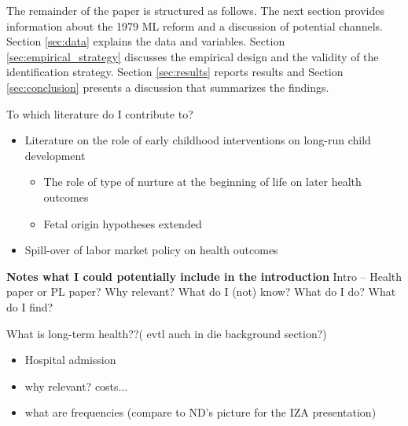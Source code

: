 \documentclass[11pt, a4paper,draft]{article} %
\begin{document}
The remainder of the paper is structured as follows. The next section provides information about the 1979 ML reform and a discussion of potential channels. Section \ref{sec:data} explains the data and variables. Section \ref{sec:empirical_strategy} discusses the empirical design and the validity of the identification strategy. Section \ref{sec:results} reports results and Section \ref{sec:conclusion} presents a discussion that summarizes the findings. 



\newpage
To which literature do I contribute to?
\begin{itemize}
	\item Literature on the role of early childhood interventions on long-run child development
	\begin{itemize}
		\item The role of type of nurture at the beginning of life on later health outcomes
		\item Fetal origin hypotheses extended
	\end{itemize}
	\item Spill-over of labor market policy on health outcomes
\end{itemize}



\textbf{Notes what I could potentially include in the introduction}\newline
Intro –
Health paper or PL paper?
Why relevant?
What do I (not) know?
What do I do?
What do I find?



What is long-term health??( evtl auch in die background section?) 
\begin{itemize}
	\item Hospital admission
	\item why relevant? costs...
	\item what are frequencies (compare to ND's picture for the IZA presentation)
\end{itemize}
\end{document}
